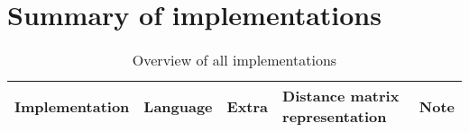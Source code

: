 \documentclass[11pt,a4paper,notitlepage]{article}
\begin{document}
\appendix

\section{Summary of implementations}
\label{app:impl}
\begin{table}
  \begin{tabular}{l|llll}
    \toprule
    Implementation & Language & Extra & Distance matrix representation
    & Note \\
    \midrule
    \bottomrule   
  \end{tabular}
  \caption{Overview of all implementations}
\end{table}



\end{document}
